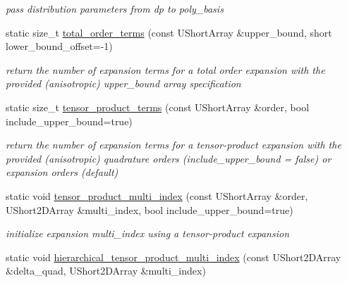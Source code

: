 \begin{DoxyCompactItemize}
\begin{DoxyCompactList}\small\item\em pass distribution parameters from dp to poly\+\_\+basis \end{DoxyCompactList}\item 
static size\+\_\+t \hyperlink{classPecos_1_1SharedPolyApproxData_ac6a31145a1818fed6c0abf9e2f038cc0}{total\+\_\+order\+\_\+terms} (const U\+Short\+Array \&upper\+\_\+bound, short lower\+\_\+bound\+\_\+offset=-\/1)
\begin{DoxyCompactList}\small\item\em return the number of expansion terms for a total order expansion with the provided (anisotropic) upper\+\_\+bound array specification \end{DoxyCompactList}\item 
static size\+\_\+t \hyperlink{classPecos_1_1SharedPolyApproxData_aeb0024f327e506c5a0ab9ce82f484e2d}{tensor\+\_\+product\+\_\+terms} (const U\+Short\+Array \&order, bool include\+\_\+upper\+\_\+bound=true)
\begin{DoxyCompactList}\small\item\em return the number of expansion terms for a tensor-\/product expansion with the provided (anisotropic) quadrature orders (include\+\_\+upper\+\_\+bound = false) or expansion orders (default) \end{DoxyCompactList}\item 
static void \hyperlink{classPecos_1_1SharedPolyApproxData_a553002bc6bd5c3f97ac3412d19a83e3f}{tensor\+\_\+product\+\_\+multi\+\_\+index} (const U\+Short\+Array \&order, U\+Short2\+D\+Array \&multi\+\_\+index, bool include\+\_\+upper\+\_\+bound=true)\label{classPecos_1_1SharedPolyApproxData_a553002bc6bd5c3f97ac3412d19a83e3f}

\begin{DoxyCompactList}\small\item\em initialize expansion multi\+\_\+index using a tensor-\/product expansion \end{DoxyCompactList}\item 
static void \hyperlink{classPecos_1_1SharedPolyApproxData_a82d46fa2e0f42304d65efda7bd618a84}{hierarchical\+\_\+tensor\+\_\+product\+\_\+multi\+\_\+index} (const U\+Short2\+D\+Array \&delta\+\_\+quad, U\+Short2\+D\+Array \&multi\+\_\+index)\label{classPecos_1_1SharedPolyApproxData_a82d46fa2e0f42304d65efda7bd618a84}


\end{DoxyCompactItemize}
